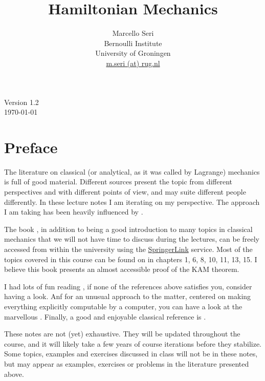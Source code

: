 \documentclass[english,fontsize=11pt,paper=a5,oneside]{scrbook}
\title{Hamiltonian Mechanics}
\author{Marcello Seri\\
\small{Bernoulli Institute}\vspace{-.2cm}\\
\small{University of Groningen}\vspace{-.2cm}\\
\small\href{mailto:m.seri@rug.nl}{m.seri (at) rug.nl}
}
\date{}
\theoremstyle{definition}
\def\biblio{}
\begin{document}
\def\biblio{}

\maketitle

\cleardoublepage

\thispagestyle{empty}
\null\vfill
\begin{center}
    Version 1.2\\
    \today
\end{center}
\vfill
\small{\doclicenseThis}

\cleardoublepage

\tableofcontents

\cleardoublepage

\chapter*{Preface}

The literature on classical (or analytical, as it was called by Lagrange) mechanics is full of good material.
Different sources present the topic from different perspectives and with different points of view, and may suite different people differently.
In these lecture notes I am iterating on my perspective.
The approach I am taking has been heavily influenced by \cite{book:arnold, book:knauf,lectures:dubrovin, book:lowenstein, book:marsdenratiu, lectures:tong,landau1976mechanics}.

The book \cite{book:knauf}, in addition to being a good introduction to many topics in classical mechanics that we will not have time to discuss during the lectures, can be freely accessed from within the university using the \href{https://link.springer.com/book/10.1007%2F978-3-662-55774-7}{SpringerLink} service.
Most of the topics covered in this course can be found on \cite{book:knauf} in chapters 1, 6, 8, 10, 11, 13, 15. I believe this book presents an almost accessible proof of the KAM theorem.

I had lots of fun reading \cite{schwichtenberg2019no}, if none of the references above satisfies you, consider having a look. Anf for an unusual approach to the matter, centered on making everything explicitly computable by a computer, you can have a look at the marvellous \cite{book:sicm}. Finally, a good and enjoyable classical reference is \cite{goldstein2013classical}.

These notes are not (yet) exhaustive.
They will be updated throughout the course, and it will likely take a few years of course iterations before they stabilize.
Some topics, examples and exercises discussed in class will not be in these notes, but may appear as examples, exercises or problems in the literature presented above.
\end{document}
